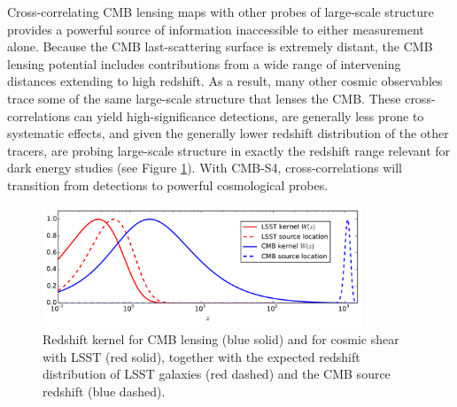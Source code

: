 Cross-correlating CMB lensing maps with other probes of large-scale structure provides a powerful source of information inaccessible to either measurement alone. Because the CMB last-scattering surface is extremely distant, the CMB lensing potential includes contributions from a wide range of 
intervening distances extending to high redshift. As a result, many other cosmic observables trace some of the same large-scale structure that lenses the CMB. These cross-correlations can yield high-significance detections, are generally less prone to systematic effects, and given the generally lower redshift distribution of the other tracers, are probing large-scale structure in exactly the redshift range relevant for dark energy studies (see Figure \ref{cmb-gal-kernels}). 
With CMB-S4, cross-correlations will transition from detections to powerful cosmological probes. 

\begin{figure}[htbp]
\centering
\includegraphics[width=0.85\textwidth]{CMBLensing/CMB_effs.pdf}
\caption{Redshift kernel for CMB lensing (blue solid) and for cosmic shear with LSST (red solid), together with the expected redshift distribution of LSST galaxies (red dashed) and the CMB source redshift (blue dashed).}
\label{cmb-gal-kernels}
\end{figure}

